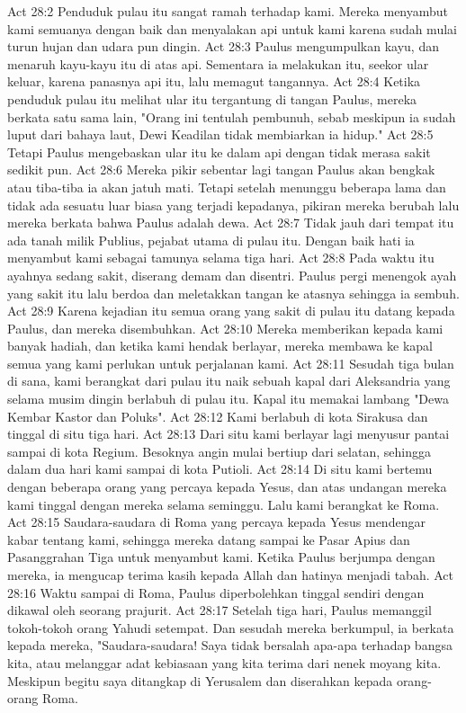 Act 28:2  Penduduk pulau itu sangat ramah terhadap kami. Mereka menyambut kami semuanya dengan baik dan menyalakan api untuk kami karena sudah mulai turun hujan dan udara pun dingin.
Act 28:3  Paulus mengumpulkan kayu, dan menaruh kayu-kayu itu di atas api. Sementara ia melakukan itu, seekor ular keluar, karena panasnya api itu, lalu memagut tangannya.
Act 28:4  Ketika penduduk pulau itu melihat ular itu tergantung di tangan Paulus, mereka berkata satu sama lain, "Orang ini tentulah pembunuh, sebab meskipun ia sudah luput dari bahaya laut, Dewi Keadilan tidak membiarkan ia hidup."
Act 28:5  Tetapi Paulus mengebaskan ular itu ke dalam api dengan tidak merasa sakit sedikit pun.
Act 28:6  Mereka pikir sebentar lagi tangan Paulus akan bengkak atau tiba-tiba ia akan jatuh mati. Tetapi setelah menunggu beberapa lama dan tidak ada sesuatu luar biasa yang terjadi kepadanya, pikiran mereka berubah lalu mereka berkata bahwa Paulus adalah dewa.
Act 28:7  Tidak jauh dari tempat itu ada tanah milik Publius, pejabat utama di pulau itu. Dengan baik hati ia menyambut kami sebagai tamunya selama tiga hari.
Act 28:8  Pada waktu itu ayahnya sedang sakit, diserang demam dan disentri. Paulus pergi menengok ayah yang sakit itu lalu berdoa dan meletakkan tangan ke atasnya sehingga ia sembuh.
Act 28:9  Karena kejadian itu semua orang yang sakit di pulau itu datang kepada Paulus, dan mereka disembuhkan.
Act 28:10  Mereka memberikan kepada kami banyak hadiah, dan ketika kami hendak berlayar, mereka membawa ke kapal semua yang kami perlukan untuk perjalanan kami.
Act 28:11  Sesudah tiga bulan di sana, kami berangkat dari pulau itu naik sebuah kapal dari Aleksandria yang selama musim dingin berlabuh di pulau itu. Kapal itu memakai lambang "Dewa Kembar Kastor dan Poluks".
Act 28:12  Kami berlabuh di kota Sirakusa dan tinggal di situ tiga hari.
Act 28:13  Dari situ kami berlayar lagi menyusur pantai sampai di kota Regium. Besoknya angin mulai bertiup dari selatan, sehingga dalam dua hari kami sampai di kota Putioli.
Act 28:14  Di situ kami bertemu dengan beberapa orang yang percaya kepada Yesus, dan atas undangan mereka kami tinggal dengan mereka selama seminggu. Lalu kami berangkat ke Roma.
Act 28:15  Saudara-saudara di Roma yang percaya kepada Yesus mendengar kabar tentang kami, sehingga mereka datang sampai ke Pasar Apius dan Pasanggrahan Tiga untuk menyambut kami. Ketika Paulus berjumpa dengan mereka, ia mengucap terima kasih kepada Allah dan hatinya menjadi tabah.
Act 28:16  Waktu sampai di Roma, Paulus diperbolehkan tinggal sendiri dengan dikawal oleh seorang prajurit.
Act 28:17  Setelah tiga hari, Paulus memanggil tokoh-tokoh orang Yahudi setempat. Dan sesudah mereka berkumpul, ia berkata kepada mereka, "Saudara-saudara! Saya tidak bersalah apa-apa terhadap bangsa kita, atau melanggar adat kebiasaan yang kita terima dari nenek moyang kita. Meskipun begitu saya ditangkap di Yerusalem dan diserahkan kepada orang-orang Roma.
